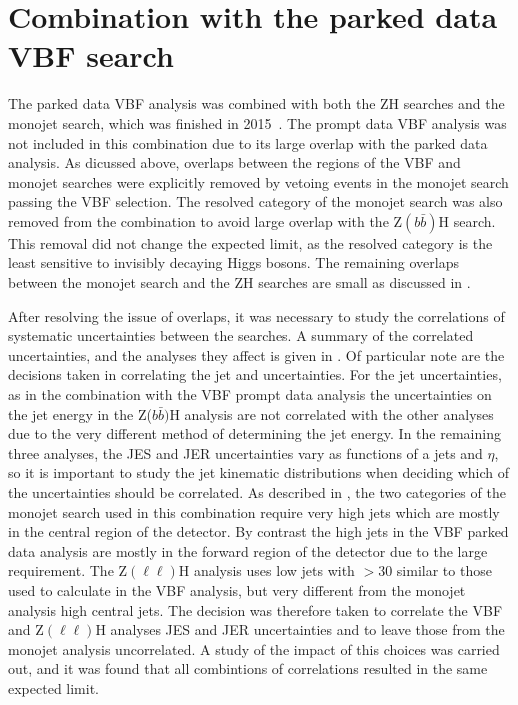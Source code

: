 \section{Combination with the parked data VBF search}
\label{sec:combparked}
The parked data \ac{VBF} analysis was combined with both the ZH searches and the monojet search, which was finished in 2015~\cite{CMS-PAS-HIG-15-012}. The prompt data \ac{VBF} analysis was not included in this combination due to its large overlap with the parked data analysis. As dicussed above, overlaps between the regions of the \ac{VBF} and monojet searches were explicitly removed by vetoing events in the monojet search passing the \ac{VBF} selection. The resolved category of the monojet search was also removed from the combination to avoid large overlap with the Z$(b\bar{b})$H search. This removal did not change the expected limit, as the resolved category is the least sensitive to invisibly decaying Higgs bosons. The remaining overlaps between the monojet search and the ZH searches are small as discussed in .

After resolving the issue of overlaps, it was necessary to study the correlations of systematic uncertainties between the searches. A summary of the correlated uncertainties, and the analyses they affect is given in . Of particular note are the decisions taken in correlating the jet and \MET uncertainties. For the jet uncertainties, as in the combination with the \ac{VBF} prompt data analysis the uncertainties on the jet energy in the Z($b\bar{b})$H analysis are not correlated with the other analyses due to the very different method of determining the jet energy. In the remaining three analyses, the \ac{JES} and \ac{JER} uncertainties vary as functions of a jets \pt and $\eta$, so it is important to study the jet kinematic distributions when deciding which of the uncertainties should be correlated. As described in , the two categories of the monojet search used in this combination require very high \pt jets which are mostly in the central region of the detector. By contrast the high \pt jets in the \ac{VBF} parked data analysis are mostly in the forward region of the detector due to the large \detajj requirement. The Z$(\ell\ell)$H analysis uses low \pt jets with \pt$>30$ \GeV similar to those used to calculate \jetmetdphi in the \ac{VBF} analysis, but very different from the monojet analysis high \pt central jets. The decision was therefore taken to correlate the \ac{VBF} and Z$(\ell\ell)$H analyses \ac{JES} and \ac{JER} uncertainties and to leave those from the monojet analysis uncorrelated. A study of the impact of this choices was carried out, and it was found that all combintions of correlations resulted in the same expected limit.

